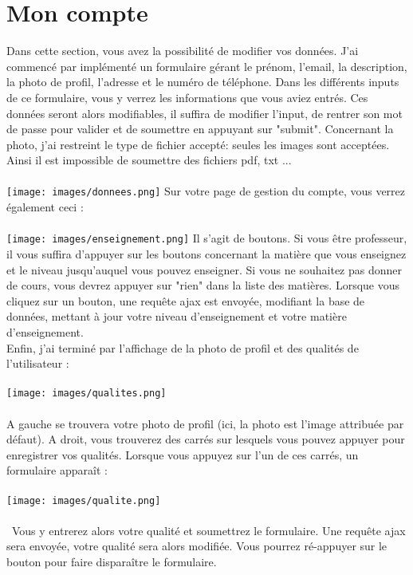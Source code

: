 \documentclass{article}%
\begin{document}
\section{Mon compte}
Dans cette section, vous avez la possibilité de modifier vos données. J'ai commencé par implémenté un formulaire gérant le prénom, l'email, la description, la photo de profil, l'adresse et le numéro de téléphone.
Dans les différents inputs de ce formulaire, vous y verrez les informations que vous aviez entrés. Ces données seront alors modifiables, il suffira de modifier l'input, de rentrer son mot de passe pour valider et de soumettre en appuyant sur "submit". Concernant la photo, j'ai restreint le type de fichier accepté: seules les images sont acceptées. Ainsi il est impossible de soumettre des fichiers pdf, txt ...\\\\
\texttt{[image: images/donnees.png]}
\newpage
Sur votre page de gestion du compte, vous verrez également ceci : \\\\
\texttt{[image: images/enseignement.png]}
Il s'agit de boutons. Si vous être professeur, il vous suffira d'appuyer sur les boutons concernant la matière que vous enseignez et le niveau jusqu'auquel vous pouvez enseigner. Si vous ne souhaitez pas donner de cours, vous devrez appuyer sur "rien" dans la liste des matières. 
Lorsque vous cliquez sur un bouton, une requête ajax est envoyée, modifiant la base de données, mettant à jour votre niveau d'enseignement et votre matière d'enseignement. \\
Enfin, j'ai terminé par l'affichage de la photo de profil et des qualités de l'utilisateur : \\\\
\texttt{[image: images/qualites.png]}
\\\\
A gauche se trouvera votre photo de profil (ici, la photo est l'image attribuée par défaut). A droit, vous trouverez des carrés sur lesquels vous pouvez appuyer pour enregistrer vos qualités. Lorsque vous appuyez sur l'un de ces carrés, un formulaire apparaît : \\\\
\texttt{[image: images/qualite.png]}
\\\\\
Vous y entrerez alors votre qualité et soumettrez le formulaire. Une requête ajax sera envoyée, votre qualité sera alors modifiée. Vous pourrez ré-appuyer sur le bouton pour faire disparaître le formulaire. 
\newpage
\end{document}
